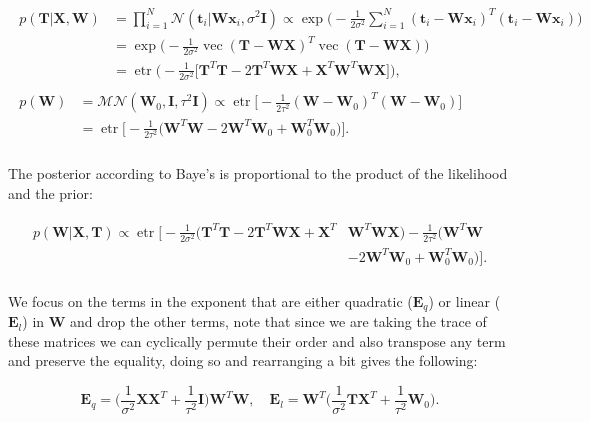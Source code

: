 \documentclass[a4paper]{article}
\DeclareMathOperator{\vect}{vec}
\DeclareMathOperator{\etr}{etr}
\begin{document}
\begin{align*}
\begin{split}
p(\mathbf{T}\vert \mathbf{X},\mathbf{W})&= \prod_{i=1}^{N}\mathcal{N}(\mathbf{t}_i\vert \mathbf{W}\mathbf{x}_i,\sigma^2\mathbf{I}) \propto \exp \bigg(-\frac{1}{2\sigma^2}\sum_{i=1}^{N}(\mathbf{t}_i-\mathbf{W}\mathbf{x}_i)^T(\mathbf{t}_i-\mathbf{W}\mathbf{x}_i)\bigg)\\ & = \exp\bigg(-\frac{1}{2\sigma^2}\vect(\mathbf{T-WX})^T\vect(\mathbf{T-WX})\bigg) \\ & = \etr \bigg(-\frac{1}{2\sigma^2}\big[\mathbf{T}^T\mathbf{T}-2\mathbf{T}^T\mathbf{WX}+\mathbf{X}^T\mathbf{W}^T\mathbf{WX}\big]\bigg),
\end{split}\\
\begin{split}
p(\mathbf{W})&= \mathcal{MN}(\mathbf{W}_0,\mathbf{I},\tau^2\mathbf{I}) \propto \etr\bigg[-\frac{1}{2\tau^2}(\mathbf{W}-\mathbf{W}_0)^T(\mathbf{W}-\mathbf{W}_0)\bigg] \\ & = \etr\bigg[-\frac{1}{2\tau^2}\bigg(\mathbf{W}^T\mathbf{W}-2\mathbf{W}^T\mathbf{W}_0+\mathbf{W}_0^T\mathbf{W}_0\bigg)\bigg].
\end{split}\\
\end{align*}

\noindent The posterior according to Baye's is proportional to the product of the likelihood and the prior:

\begin{align*}
\begin{split}
p(\mathbf{W}\vert \mathbf{X},\mathbf{T})\propto\etr\bigg[-\frac{1}{2\sigma^2}\bigg(\mathbf{T}^T\mathbf{T}-2\mathbf{T}^T\mathbf{WX}+\mathbf{X}^T&\mathbf{W}^T\mathbf{WX}\bigg)-\frac{1}{2\tau^2}\bigg(\mathbf{W}^T\mathbf{W}\\&-2\mathbf{W}^T\mathbf{W}_0+\mathbf{W}_0^T\mathbf{W}_0\bigg)\bigg].
\end{split}\\
\end{align*}

\noindent We focus on the terms in the exponent that are either quadratic ($\mathbf{E}_q$) or linear ($\mathbf{E}_l$) in $\mathbf{W}$ and drop the other terms, note that since we are taking the trace of these matrices we can cyclically permute their order and also transpose any term and preserve the equality, doing so and rearranging a bit gives the following:

\begin{equation*}
\mathbf{E}_q = \bigg(\frac{1}{\sigma^2}\mathbf{XX}^T+\frac{1}{\tau^2}\mathbf{I}\bigg)\mathbf{W}^T\mathbf{W},\quad \mathbf{E}_l = \mathbf{W}^T\bigg(\frac{1}{\sigma^2}\mathbf{TX}^T+\frac{1}{\tau^2}\mathbf{W}_0\bigg).
\end{equation*}
\end{document}
